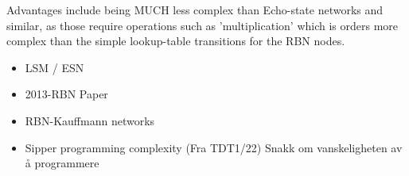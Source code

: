 Advantages include being MUCH less complex than Echo-state networks and similar, as those require operations such as 'multiplication' which is orders more complex than the simple lookup-table transitions for the RBN nodes.


\begin{itemize}
  \item LSM / ESN
  \item 2013-RBN Paper
  \item RBN-Kauffmann networks
  \item Sipper programming complexity (Fra TDT1/22) Snakk om vanskeligheten av å programmere
\end{itemize}
